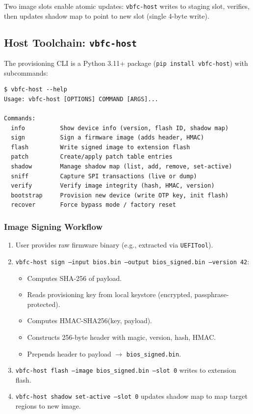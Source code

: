 Two image slots enable atomic updates: \texttt{vbfc-host} writes to staging slot, verifies, then updates shadow map to point to new slot (single 4-byte write).

\subsection{Host Toolchain: \texttt{vbfc-host}}
The provisioning CLI is a Python 3.11+ package (\texttt{pip install vbfc-host}) with subcommands:

\begin{lstlisting}[style=vbfcStyle, caption={\texttt{vbfc-host} Command Structure}, label={lst:vbfc_host}]
$ vbfc-host --help
Usage: vbfc-host [OPTIONS] COMMAND [ARGS]...

Commands:
  info          Show device info (version, flash ID, shadow map)
  sign          Sign a firmware image (adds header, HMAC)
  flash         Write signed image to extension flash
  patch         Create/apply patch table entries
  shadow        Manage shadow map (list, add, remove, set-active)
  sniff         Capture SPI transactions (live or dump)
  verify        Verify image integrity (hash, HMAC, version)
  bootstrap     Provision new device (write OTP key, init flash)
  recover       Force bypass mode / factory reset
\end{lstlisting}

\subsubsection{Image Signing Workflow}
\begin{enumerate}
    \item User provides raw firmware binary (e.g., extracted via \texttt{UEFITool}).
    \item \texttt{vbfc-host sign --input bios.bin --output bios\_signed.bin --version 42}:
    \begin{itemize}
        \item Computes SHA-256 of payload.
        \item Reads provisioning key from local keystore (encrypted, passphrase-protected).
        \item Computes HMAC-SHA256(key, payload).
        \item Constructs 256-byte header with magic, version, hash, HMAC.
        \item Prepends header to payload $\to$ \texttt{bios\_signed.bin}.
    \end{itemize}
    \item \texttt{vbfc-host flash --image bios\_signed.bin --slot 0} writes to extension flash.
    \item \texttt{vbfc-host shadow set-active --slot 0} updates shadow map to map target regions to new image.
\end{enumerate}

